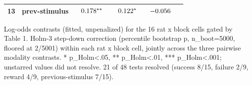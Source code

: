 \begin{table}[htbp]
{\begin{tabular}{lcccc}
13 & prev-stimulus & $\hphantom{-}0.178^{**\hphantom{*}}$ & $\hphantom{-}0.122^{*\hphantom{**}}$ & $-0.056^{\hphantom{***}}$ \\
\bottomrule
\end{tabular}
}
\vspace{4pt}
\par\noindent
\begin{minipage}{\linewidth}\small Log-odds contrasts (fitted, unpenalized) for the 16 rat x block cells gated by Table 1. Holm-3 step-down correction (percentile bootstrap p, n\_boot=5000, floored at 2/5001) within each rat x block cell, jointly across the three pairwise modality contrasts. * p\_Holm<.05, ** p\_Holm<.01, *** p\_Holm<.001; unstarred values did not resolve. 21 of 48 tests resolved (success 8/15, failure 2/9, reward 4/9, previous-stimulus 7/15).\end{minipage}
\end{table}